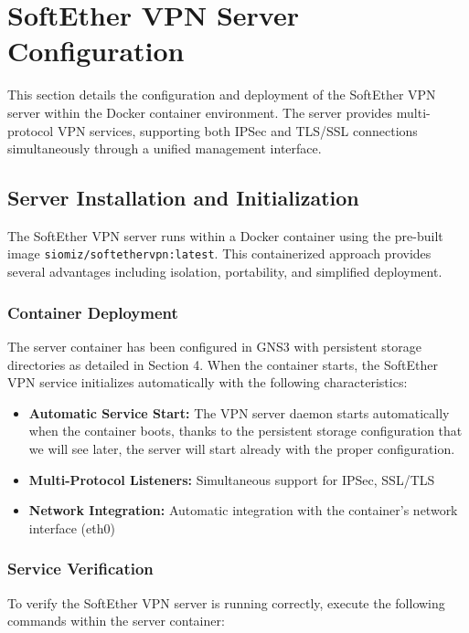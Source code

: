 \newpage

\section{SoftEther VPN Server Configuration}

This section details the configuration and deployment of the SoftEther VPN server within the Docker container environment. The server provides multi-protocol VPN services, supporting both IPSec and TLS/SSL connections simultaneously through a unified management interface.

\subsection{Server Installation and Initialization}

The SoftEther VPN server runs within a Docker container using the pre-built image \texttt{siomiz/softethervpn:latest}. This containerized approach provides several advantages including isolation, portability, and simplified deployment.

\subsubsection{Container Deployment}

The server container has been configured in GNS3 with persistent storage directories as detailed in Section 4. When the container starts, the SoftEther VPN service initializes automatically with the following characteristics:

\begin{itemize}
    \item \textbf{Automatic Service Start:} The VPN server daemon starts automatically when the container boots, thanks to the persistent storage configuration that we will see later, the server will start already with the proper configuration.
    \item \textbf{Multi-Protocol Listeners:} Simultaneous support for IPSec, SSL/TLS
    \item \textbf{Network Integration:} Automatic integration with the container's network interface (eth0)
\end{itemize}

\subsubsection{Service Verification}

To verify the SoftEther VPN server is running correctly, execute the following commands within the server container:

